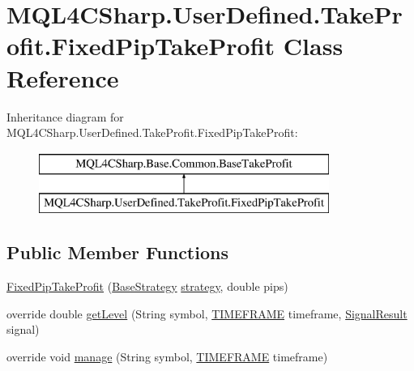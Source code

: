 \hypertarget{class_m_q_l4_c_sharp_1_1_user_defined_1_1_take_profit_1_1_fixed_pip_take_profit}{}\section{M\+Q\+L4\+C\+Sharp.\+User\+Defined.\+Take\+Profit.\+Fixed\+Pip\+Take\+Profit Class Reference}
\label{class_m_q_l4_c_sharp_1_1_user_defined_1_1_take_profit_1_1_fixed_pip_take_profit}
Inheritance diagram for M\+Q\+L4\+C\+Sharp.\+User\+Defined.\+Take\+Profit.\+Fixed\+Pip\+Take\+Profit\+:\begin{figure}[H]
\begin{center}
\leavevmode
\includegraphics[height=2.000000cm]{class_m_q_l4_c_sharp_1_1_user_defined_1_1_take_profit_1_1_fixed_pip_take_profit}
\end{center}
\end{figure}
\subsection*{Public Member Functions}
\begin{DoxyCompactItemize}
\item 
\hyperlink{class_m_q_l4_c_sharp_1_1_user_defined_1_1_take_profit_1_1_fixed_pip_take_profit_a802596cbc9495705f31d76934e00025a}{Fixed\+Pip\+Take\+Profit} (\hyperlink{class_m_q_l4_c_sharp_1_1_base_1_1_base_strategy}{Base\+Strategy} \hyperlink{class_m_q_l4_c_sharp_1_1_base_1_1_common_1_1_base_take_profit_a1846f084c91f056e7de1f8e41f7c6625}{strategy}, double pips)
\item 
override double \hyperlink{class_m_q_l4_c_sharp_1_1_user_defined_1_1_take_profit_1_1_fixed_pip_take_profit_aac72c0136a2a903e73796466bad4fc92}{get\+Level} (String symbol, \hyperlink{namespace_m_q_l4_c_sharp_1_1_base_1_1_enums_a838810aaa87c63c12737408dba8c0b35}{T\+I\+M\+E\+F\+R\+A\+ME} timeframe, \hyperlink{class_m_q_l4_c_sharp_1_1_base_1_1_common_1_1_signal_result}{Signal\+Result} signal)
\item 
override void \hyperlink{class_m_q_l4_c_sharp_1_1_user_defined_1_1_take_profit_1_1_fixed_pip_take_profit_a0080f257d1de5eca8b2a6e4056c830a1}{manage} (String symbol, \hyperlink{namespace_m_q_l4_c_sharp_1_1_base_1_1_enums_a838810aaa87c63c12737408dba8c0b35}{T\+I\+M\+E\+F\+R\+A\+ME} timeframe)
\end{DoxyCompactItemize}
